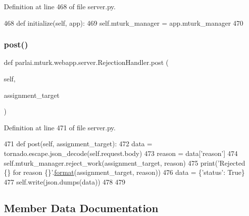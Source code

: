 Definition at line 468 of file server.\+py.


\begin{DoxyCode}
468     \textcolor{keyword}{def }initialize(self, app):
469         self.mturk\_manager = app.mturk\_manager
470 
\end{DoxyCode}
\mbox{\label{classparlai_1_1mturk_1_1webapp_1_1server_1_1RejectionHandler_ab53a292bed562b166bd63ef81ae38a43}} 
\subsubsection{\texorpdfstring{post()}{post()}}
{\footnotesize\ttfamily def parlai.\+mturk.\+webapp.\+server.\+Rejection\+Handler.\+post (\begin{DoxyParamCaption}\item[{}]{self,  }\item[{}]{assignment\+\_\+target }\end{DoxyParamCaption})}



Definition at line 471 of file server.\+py.


\begin{DoxyCode}
471     \textcolor{keyword}{def }post(self, assignment\_target):
472         data = tornado.escape.json\_decode(self.request.body)
473         reason = data[\textcolor{stringliteral}{'reason'}]
474         self.mturk\_manager.reject\_work(assignment\_target, reason)
475         print(\textcolor{stringliteral}{'Rejected \{\} for reason \{\}'}.\hyperlink{namespaceparlai_1_1chat__service_1_1services_1_1messenger_1_1shared__utils_a32e2e2022b824fbaf80c747160b52a76}{format}(assignment\_target, reason))
476         data = \{\textcolor{stringliteral}{'status'}: \textcolor{keyword}{True}\}
477         self.write(json.dumps(data))
478 
479 
\end{DoxyCode}


\subsection{Member Data Documentation}
\mbox{\label{classparlai_1_1mturk_1_1webapp_1_1server_1_1RejectionHandler_add298625ab3b54fd34cc774e7eeb9e7c}} 
